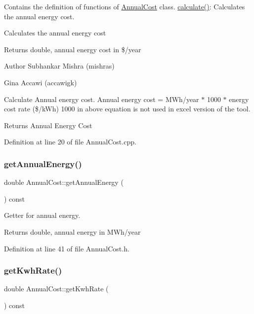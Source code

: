 Contains the definition of functions of \hyperlink{class_annual_cost}{Annual\+Cost} class. \hyperlink{class_annual_cost_adb12b66af50d01746c3f6f0d430b1fdd}{calculate()}\+: Calculates the annual energy cost. 

Calculates the annual energy cost \begin{DoxyReturn}{Returns}
double, annual energy cost in \$/year
\end{DoxyReturn}
\begin{DoxyAuthor}{Author}
Subhankar Mishra (mishras) 

Gina Accawi (accawigk) 
\end{DoxyAuthor}
Calculate Annual energy cost. Annual energy cost = M\+Wh/year $\ast$ 1000 $\ast$ energy cost rate (\$/k\+Wh) 1000 in above equation is not used in excel version of the tool.

\begin{DoxyReturn}{Returns}
Annual Energy Cost 
\end{DoxyReturn}


Definition at line 20 of file Annual\+Cost.\+cpp.

\mbox{\label{class_annual_cost_a0e217b7df05e6a03503e14d96570a192}} 
\subsubsection{\texorpdfstring{get\+Annual\+Energy()}{getAnnualEnergy()}}
{\footnotesize\ttfamily double Annual\+Cost\+::get\+Annual\+Energy (\begin{DoxyParamCaption}{ }\end{DoxyParamCaption}) const\hspace{0.3cm}{\ttfamily [inline]}}

Getter for annual energy. \begin{DoxyReturn}{Returns}
double, annual energy in M\+Wh/year 
\end{DoxyReturn}


Definition at line 41 of file Annual\+Cost.\+h.

\mbox{\label{class_annual_cost_ac01ed415360b6f52f61ec8a581333c29}} 
\subsubsection{\texorpdfstring{get\+Kwh\+Rate()}{getKwhRate()}}
{\footnotesize\ttfamily double Annual\+Cost\+::get\+Kwh\+Rate (\begin{DoxyParamCaption}{ }\end{DoxyParamCaption}) const\hspace{0.3cm}{\ttfamily [inline]}}

